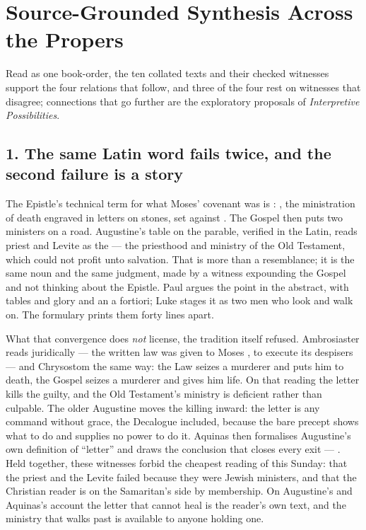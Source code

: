 \sectionguard
\section*{Source-Grounded Synthesis Across the Propers}

Read as one book-order, the ten collated texts and their checked witnesses
support the four relations that follow, and three of the four rest on
witnesses that disagree; connections that go further are the exploratory
proposals of \textit{Interpretive Possibilities}.

\subsection*{1. The same Latin word fails twice, and the second failure is a story}

The Epistle's technical term for what Moses' covenant was is
: , the ministration of death
engraved in letters on stones, set against . The
Gospel then puts two ministers on a road. Augustine's table on the parable,
verified in the Latin, reads priest and Levite as the  --- the
priesthood and ministry of the Old Testament, which could not profit unto
salvation. That is more than a resemblance; it is the same noun and the
same judgment, made by a witness expounding the Gospel and not thinking about
the Epistle. Paul argues the point in the abstract, with tables and glory and
an a fortiori; Luke stages it as two men who look and walk on. The formulary
prints them forty lines apart.

What that convergence does \textit{not} license, the tradition itself
refused. Ambrosiaster reads 
juridically --- the written law was given to Moses , to execute its despisers --- and Chrysostom the same way: the Law
seizes a murderer and puts him to death, the Gospel seizes a murderer and
gives him life. On that reading the letter kills the guilty, and the Old
Testament's ministry is deficient rather than culpable. The older Augustine
moves the killing inward: the letter is any command without grace, the
Decalogue included, because the bare precept shows what to do and supplies no
power to do it. Aquinas then formalises Augustine's own definition of
``letter'' and draws the conclusion that closes every exit ---
. Held together, these witnesses forbid the cheapest reading of this
Sunday: that the priest and the Levite failed because they were Jewish
ministers, and that the Christian reader is on the Samaritan's side by
membership. On Augustine's and Aquinas's account the letter that cannot heal
is the reader's own text, and the ministry that walks past is available to
anyone holding one.

